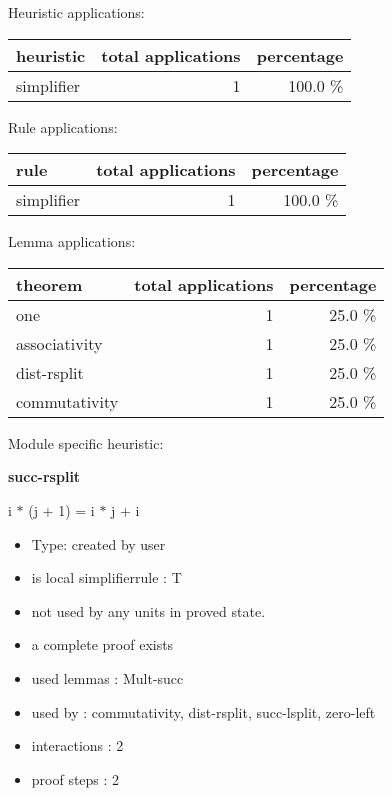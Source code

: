 \documentclass[a4paper]{article}
\begin{document}
\medskip


Heuristic applications:

\begin{supertabular}{l|r|r}
heuristic	& total applications & percentage \\ \hline
simplifier & 1 & 100.0 \% \\

\end{supertabular}

Rule applications:

\begin{supertabular}{l|r|r}
rule	        & total applications & percentage \\ \hline
simplifier & 1 & 100.0 \% \\

\end{supertabular}

Lemma applications:

\begin{supertabular}{l|r|r}
theorem	        & total applications & percentage \\ \hline
one & 1 & 25.0 \% \\
associativity & 1 & 25.0 \% \\
dist-rsplit & 1 & 25.0 \% \\
commutativity & 1 & 25.0 \% \\

\end{supertabular}

Module specific heuristic:

\pagebreak

{\LARGE\bf succ-rsplit}\label{lemma-succ-rsplit}

\medskip

 \Fol i $*$ (j + 1) = i $*$ j + i

\begin{itemize}

\item Type: created by user

\item is local simplifierrule : T
\item not used by any units in proved state.
\item       a complete proof exists
\item       used lemmas  : Mult-succ
\item       used by      : commutativity, dist-rsplit, succ-lsplit, zero-left
\item       interactions : 2
\item       proof steps  : 2
\end{itemize}
\end{document}
